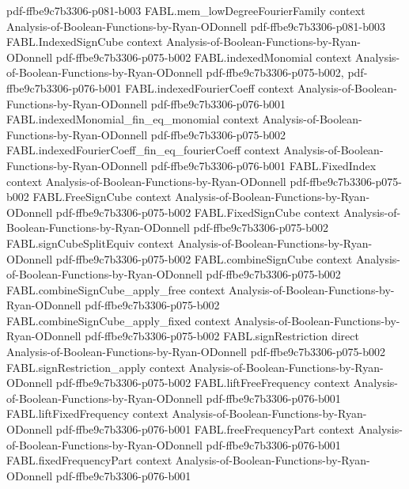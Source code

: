\begin{theorem}
  {pdf-ffbe9c7b3306-p081-b003}
\proofstep
  {FABL.mem_lowDegreeFourierFamily}
  {context}
  {Analysis-of-Boolean-Functions-by-Ryan-ODonnell}
  {pdf-ffbe9c7b3306-p081-b003}
\proofstep
  {FABL.IndexedSignCube}
  {context}
  {Analysis-of-Boolean-Functions-by-Ryan-ODonnell}
  {pdf-ffbe9c7b3306-p075-b002}
\proofstep
  {FABL.indexedMonomial}
  {context}
  {Analysis-of-Boolean-Functions-by-Ryan-ODonnell}
  {pdf-ffbe9c7b3306-p075-b002,
    pdf-ffbe9c7b3306-p076-b001}
\proofstep
  {FABL.indexedFourierCoeff}
  {context}
  {Analysis-of-Boolean-Functions-by-Ryan-ODonnell}
  {pdf-ffbe9c7b3306-p076-b001}
\proofstep
  {FABL.indexedMonomial_fin_eq_monomial}
  {context}
  {Analysis-of-Boolean-Functions-by-Ryan-ODonnell}
  {pdf-ffbe9c7b3306-p075-b002}
\proofstep
  {FABL.indexedFourierCoeff_fin_eq_fourierCoeff}
  {context}
  {Analysis-of-Boolean-Functions-by-Ryan-ODonnell}
  {pdf-ffbe9c7b3306-p076-b001}
\proofstep
  {FABL.FixedIndex}
  {context}
  {Analysis-of-Boolean-Functions-by-Ryan-ODonnell}
  {pdf-ffbe9c7b3306-p075-b002}
\proofstep
  {FABL.FreeSignCube}
  {context}
  {Analysis-of-Boolean-Functions-by-Ryan-ODonnell}
  {pdf-ffbe9c7b3306-p075-b002}
\proofstep
  {FABL.FixedSignCube}
  {context}
  {Analysis-of-Boolean-Functions-by-Ryan-ODonnell}
  {pdf-ffbe9c7b3306-p075-b002}
\proofstep
  {FABL.signCubeSplitEquiv}
  {context}
  {Analysis-of-Boolean-Functions-by-Ryan-ODonnell}
  {pdf-ffbe9c7b3306-p075-b002}
\proofstep
  {FABL.combineSignCube}
  {context}
  {Analysis-of-Boolean-Functions-by-Ryan-ODonnell}
  {pdf-ffbe9c7b3306-p075-b002}
\proofstep
  {FABL.combineSignCube_apply_free}
  {context}
  {Analysis-of-Boolean-Functions-by-Ryan-ODonnell}
  {pdf-ffbe9c7b3306-p075-b002}
\proofstep
  {FABL.combineSignCube_apply_fixed}
  {context}
  {Analysis-of-Boolean-Functions-by-Ryan-ODonnell}
  {pdf-ffbe9c7b3306-p075-b002}
\proofstep
  {FABL.signRestriction}
  {direct}
  {Analysis-of-Boolean-Functions-by-Ryan-ODonnell}
  {pdf-ffbe9c7b3306-p075-b002}
\proofstep
  {FABL.signRestriction_apply}
  {context}
  {Analysis-of-Boolean-Functions-by-Ryan-ODonnell}
  {pdf-ffbe9c7b3306-p075-b002}
\proofstep
  {FABL.liftFreeFrequency}
  {context}
  {Analysis-of-Boolean-Functions-by-Ryan-ODonnell}
  {pdf-ffbe9c7b3306-p076-b001}
\proofstep
  {FABL.liftFixedFrequency}
  {context}
  {Analysis-of-Boolean-Functions-by-Ryan-ODonnell}
  {pdf-ffbe9c7b3306-p076-b001}
\proofstep
  {FABL.freeFrequencyPart}
  {context}
  {Analysis-of-Boolean-Functions-by-Ryan-ODonnell}
  {pdf-ffbe9c7b3306-p076-b001}
\proofstep
  {FABL.fixedFrequencyPart}
  {context}
  {Analysis-of-Boolean-Functions-by-Ryan-ODonnell}
  {pdf-ffbe9c7b3306-p076-b001}

\end{theorem}

